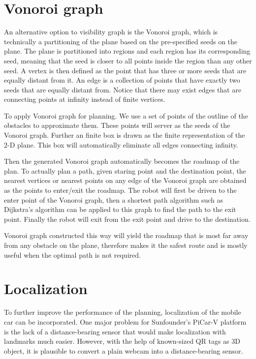 \documentclass[12pt]{article}
\begin{document}
\section{Vonoroi graph}
\label{Vonoroi}
An alternative option to visibility graph is the Vonoroi graph, which is technically a partitioning of the plane based on the pre-specified seeds on the plane. The plane is partitioned into regions and each region has its corresponding seed, meaning that the seed is closer to all points inside the region than any other seed. A vertex is then defined as the point that has three or more seeds that are equally distant from it. An edge is a  collection of points that have exactly two seeds that are equally distant from.
Notice that there may exist edges that are connecting points at infinity instead of finite vertices. 

To apply Vonoroi graph for planning. We use a set of points of the outline of the obstacles to approximate them. These points will server as the seeds of the Vonoroi graph. Further an finite box is drawn as the finite representation of the 2-D plane. This box will automatically eliminate all  edges connecting infinity.

Then the generated Vonoroi graph automatically becomes the roadmap of the plan. To actually plan a path, given staring point and the destination point, the nearest vertices or nearest points on any edge of the Vonoroi graph are obtained as the points to enter/exit the roadmap. The robot will first be driven to the enter point of the Vonoroi graph, then a shortest path algorithm such as Dijkstra's algorithm can be applied to this graph to find the path to the exit point. Finally the robot will exit from the exit point and drive to the destination.

Vonoroi graph constructed this way will yield the roadmap that is most far away from any obstacle on the plane, therefore makes it the safest route and is mostly useful when the optimal path is not required.
\label{EKF}
\section{Localization}
To further improve the performance of the planning, localization of the mobile car can be incorporated.
One major problem for Sunfounder's PiCar-V platform is the lack of a distance-bearing sensor that would make localization with landmarks much easier. However, with the help of known-sized QR tags as 3D object, it is plausible to convert a plain webcam into a distance-bearing sensor.
\end{document}
